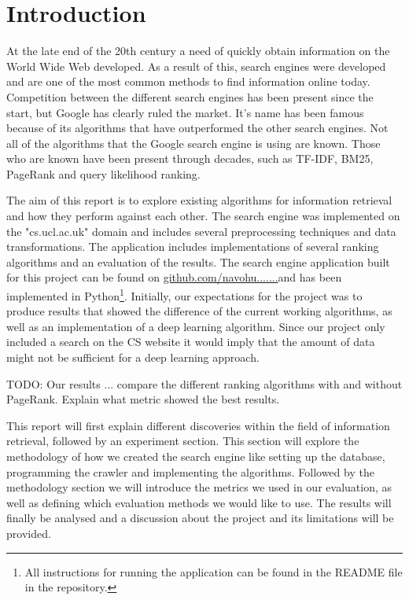 \section{Introduction}

At the late end of the 20th century a need of quickly obtain information on the World Wide Web developed. As a result of this, search engines were developed and are one of the most common methods to find information online today. Competition between the different search engines has been present since the start, but Google has clearly ruled the market. It's name has been famous because of its algorithms that have outperformed the other search engines. Not all of the algorithms that the Google search engine is using are known. Those who are known have been present through decades, such as TF-IDF, BM25, PageRank and query likelihood ranking.

The aim of this report is to explore existing algorithms for information retrieval and how they perform against each other. The search engine was implemented on the "cs.ucl.ac.uk" domain and includes several preprocessing techniques and data transformations. The application includes implementations of several ranking algorithms and an evaluation of the results. The search engine application built for this project can be found on \url{github.com/navohu.......}and has been implemented in Python\footnote{All instructions for running the application can be found in the README file in the repository.}. Initially, our expectations for the project was to produce results that showed the difference of the current working algorithms, as well as an implementation of a deep learning algorithm. Since our project only included a search on the CS website it would imply that the amount of data might not be sufficient for a deep learning approach.



TODO: Our results ... compare the different ranking algorithms with and without PageRank. Explain what metric showed the best results.


This report will first explain different discoveries within the field of information retrieval, followed by an experiment section. This section will explore the methodology of how we created the search engine like setting up the database, programming the crawler and implementing the algorithms. Followed by the methodology section we will introduce the metrics we used in our evaluation, as well as defining which evaluation methods we would like to use. The results will finally be analysed and a discussion about the project and its limitations will be provided.


